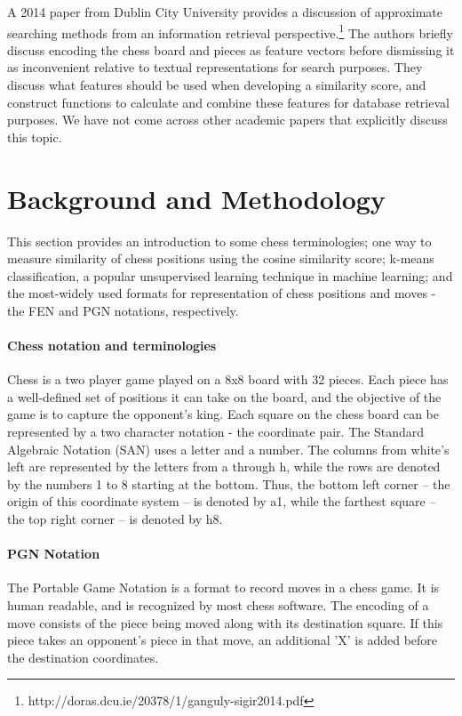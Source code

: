 \documentclass{article}
\begin{document}
 A 2014 paper from Dublin City University provides a discussion of approximate searching methods from an information retrieval perspective.\footnote{http://doras.dcu.ie/20378/1/ganguly-sigir2014.pdf} The authors briefly discuss encoding the chess board and pieces as feature vectors before dismissing it as inconvenient relative to textual representations for search purposes. They discuss what features should be used when developing a similarity score, and construct functions to calculate and combine these features for database retrieval purposes. We have not come across other academic papers that explicitly discuss this topic.

\section{Background and Methodology}

This section provides an introduction to some chess terminologies; one way to measure similarity of chess positions using the cosine similarity score; k-means classification, a popular unsupervised learning technique in machine learning; and the most-widely used formats for representation of chess positions and moves - the FEN and PGN notations, respectively.

\paragraph{Chess notation and terminologies}
Chess is a two player game played on a 8x8 board with 32 pieces. Each piece has a well-defined set of positions it can take on the board, and the objective of the game is to capture the opponent's king. Each square on the chess board can be represented by a two character notation - the coordinate pair. The Standard Algebraic Notation (SAN) uses a letter and a number. The columns from white's left are represented by the letters from a through h, while the rows are denoted by the numbers 1 to 8 starting at the bottom. Thus, the bottom left corner – the origin of this coordinate system – is denoted by a1, while the farthest square – the top right corner – is denoted by h8.

\paragraph{PGN Notation} The Portable Game Notation is a format to record moves in a chess game. It is human readable, and is recognized by most chess software. The encoding of a move consists of the piece being moved along with its destination square. If this piece takes an opponent's piece in that move, an additional 'X' is added before the destination coordinates.
\end{document}
